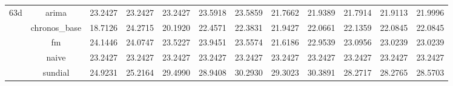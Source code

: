 \begin{table}[H]
{\begin{tabular}{cccccccccccc}
\multirow[c]{5}{*}{63d} & arima & 23.2427 & 23.2427 & 23.2427 & 23.5918 & 23.5859 & 21.7662 & 21.9389 & 21.7914 & 21.9113 & 21.9996 \\
 & chronos_base & 18.7126 & 24.2715 & 20.1920 & 22.4571 & 22.3831 & 21.9427 & 22.0661 & 22.1359 & 22.0845 & 22.0845 \\
 & fm & 24.1446 & 24.0747 & 23.5227 & 23.9451 & 23.5574 & 21.6186 & 22.9539 & 23.0956 & 23.0239 & 23.0239 \\
 & naive & 23.2427 & 23.2427 & 23.2427 & 23.2427 & 23.2427 & 23.2427 & 23.2427 & 23.2427 & 23.2427 & 23.2427 \\
 & sundial & 24.9231 & 25.2164 & 29.4990 & 28.9408 & 30.2930 & 29.3023 & 30.3891 & 28.2717 & 28.2765 & 28.5703 \\
\bottomrule
\end{tabular}

 }
\end{table}